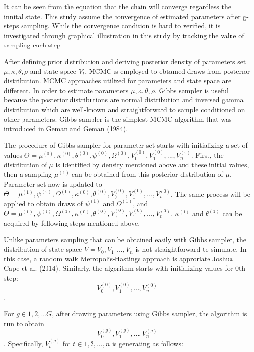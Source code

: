 \documentclass[12pt,a4paper]{article}
\numberwithin{equation}{section}
\begin{document}
It can be seen from the equation that the chain will converge regardless the innital state. This study assume the convergence of estimated parameters after g-steps sampling. While the convergence condition is hard to verified, it is investigated through graphical illustration in this study by tracking the value of sampling each step.

After defining prior distribution and deriving posterior density of parameters set $\mu, \kappa, \theta, \rho$ and state space $V_t$, MCMC is employed to obtained draws from posterior distribution. MCMC approaches utilized for parameters and state space are different. In order to estimate parameters $\mu, \kappa, \theta, \rho$, Gibbs sampler is useful because the posterior distributions are normal distribution and inversed gamma distribution which are well-known and straightforward to sample conditioned on other parameters. Gibbs sampler is the simplest MCMC algorithm that was introduced in Geman and Geman (1984). 

The procedure of Gibbs sampler for parameter set starts with initializing a set of values $\Theta = { \mu^{(0)}, \kappa^{(0)}, \theta^{(0)}, \psi^{(0)}, \Omega^{(0)}, V_0^{(0)}, V_1^{(0)}, ..., V_n^{(0)} }$. First, the distribution of $\mu$ is identified by density mentioned above and these initial values, then a sampling $\mu^{(1)}$ can be obtained from this posterior distribution of $\mu$. Parameter set now is updated to $\Theta = { \mu^{(1)},\psi^{(0)}, \Omega^{(0)}, \kappa^{(0)}, \theta^{(0)}, V_0^{(0)}, V_1^{(0)}, ..., V_n^{(0)} }$. The same process will be applied to obtain draws of $\psi^{(1)}$ and $\Omega^{(1)}$, and  $\Theta = { \mu^{(1)},\psi^{(1)}, \Omega^{(1)}, \kappa^{(0)}, \theta^{(0)}, V_0^{(0)}, V_1^{(0)}, ..., V_n^{(0)} }$. $\kappa^{(1)}$ and $\theta^{(1)}$ can be acquired by following steps mentioned above. 

Unlike parameters sampling that can be obtained easily with Gibbs sampler, the distribution of state space $V = V_0, V_1, ..., V_n$ is not straightforward to simulate. In this case, a random walk Metropolis-Hastings approach is approriate Joshua Cape et al. (2014). Similarly, the algorithm starts with initializing values for 0th step:
\[V_0^{(0)}, V_1^{(0)}, ..., V_n^{(0)}\].

For $g \in {1, 2, ... G}$, after drawing parameters using Gibbs sampler, the algorithm is run to obtain \[V_0^{(g)}, V_1^{(g)}, ..., V_n^{(g)}\]. Specifically, $V_t^{(g)}$ for $t \in {1, 2, ..., n}$ is generating as follows:
\end{document}
